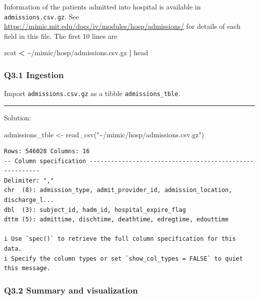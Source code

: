 \documentclass[
]{article}
\newenvironment{Shaded}{\begin{snugshade}}{\end{snugshade}}
\newcommand{\FunctionTok}[1]{\textcolor[rgb]{0.00,0.00,0.00}{#1}}
\newcommand{\KeywordTok}[1]{\textcolor[rgb]{0.13,0.29,0.53}{\textbf{#1}}}
\newcommand{\NormalTok}[1]{\textcolor[rgb]{0.00,0.00,0.00}{#1}}
\newcommand{\OperatorTok}[1]{\textcolor[rgb]{0.81,0.36,0.00}{\textbf{#1}}}
\newcommand{\OtherTok}[1]{\textcolor[rgb]{0.56,0.35,0.01}{#1}}
\newcommand{\StringTok}[1]{\textcolor[rgb]{0.31,0.60,0.02}{#1}}
\begin{document}
Information of the patients admitted into hospital is available in
\texttt{admissions.csv.gz}. See
\url{https://mimic.mit.edu/docs/iv/modules/hosp/admissions/} for details
of each field in this file. The first 10 lines are

\begin{Shaded}
\begin{Highlighting}[]
\FunctionTok{zcat} \OperatorTok{\textless{}}\NormalTok{ \textasciitilde{}/mimic/hosp/admissions.csv.gz }\KeywordTok{|} \FunctionTok{head}
\end{Highlighting}
\end{Shaded}

\hypertarget{q3.1-ingestion}{%
\subsubsection{Q3.1 Ingestion}\label{q3.1-ingestion}}

Import \texttt{admissions.csv.gz} as a tibble \texttt{admissions\_tble}.

\begin{center}\rule{0.5\linewidth}{0.5pt}\end{center}

Solution:

\begin{Shaded}
\begin{Highlighting}[]
\NormalTok{admissions\_tble }\OtherTok{\textless{}{-}} \FunctionTok{read\_csv}\NormalTok{(}\StringTok{"\textasciitilde{}/mimic/hosp/admissions.csv.gz"}\NormalTok{)}
\end{Highlighting}
\end{Shaded}

\begin{verbatim}
Rows: 546028 Columns: 16
-- Column specification --------------------------------------------------------
Delimiter: ","
chr  (8): admission_type, admit_provider_id, admission_location, discharge_l...
dbl  (3): subject_id, hadm_id, hospital_expire_flag
dttm (5): admittime, dischtime, deathtime, edregtime, edouttime

i Use `spec()` to retrieve the full column specification for this data.
i Specify the column types or set `show_col_types = FALSE` to quiet this message.
\end{verbatim}

\hypertarget{q3.2-summary-and-visualization}{%
\subsubsection{Q3.2 Summary and
visualization}\label{q3.2-summary-and-visualization}}
\end{document}

